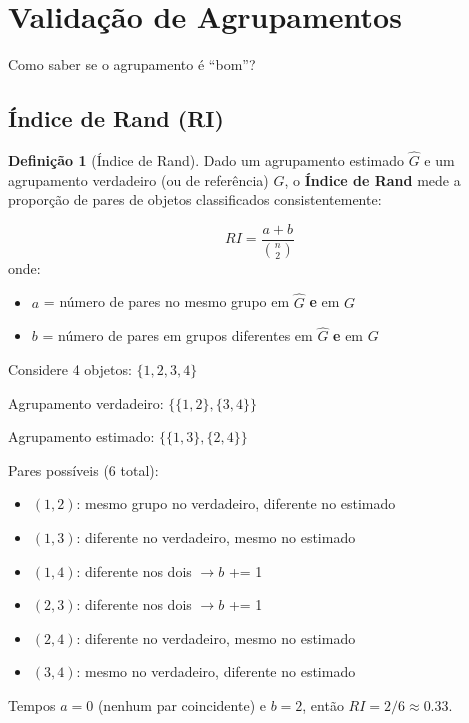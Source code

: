 \documentclass[12pt,a4paper]{article}
\theoremstyle{definition}
\newtheorem{definicao}{Definição}[section]
\begin{document}
\section{Validação de Agrupamentos}

Como saber se o agrupamento é ``bom''?

\subsection{Índice de Rand (RI)}

\begin{definicao}[Índice de Rand]
Dado um agrupamento estimado $\hat{G}$ e um agrupamento verdadeiro (ou de referência) $G$, o \textbf{Índice de Rand} mede a proporção de pares de objetos classificados consistentemente:

\begin{equation}
RI = \frac{a + b}{\binom{n}{2}}
\end{equation}
onde:
\begin{itemize}
    \item $a$ = número de pares no mesmo grupo em $\hat{G}$ \textbf{e} em $G$
    \item $b$ = número de pares em grupos diferentes em $\hat{G}$ \textbf{e} em $G$
\end{itemize}
\end{definicao}

\begin{tcolorbox}[caixaconceito={Exemplo Numérico}]
Considere 4 objetos: $\{1, 2, 3, 4\}$

Agrupamento verdadeiro: $\{\{1,2\}, \{3,4\}\}$

Agrupamento estimado: $\{\{1,3\}, \{2,4\}\}$

Pares possíveis (6 total):
\begin{itemize}
    \item $(1,2)$: mesmo grupo no verdadeiro, diferente no estimado
    \item $(1,3)$: diferente no verdadeiro, mesmo no estimado
    \item $(1,4)$: diferente nos dois $\rightarrow b$ += 1
    \item $(2,3)$: diferente nos dois $\rightarrow b$ += 1
    \item $(2,4)$: diferente no verdadeiro, mesmo no estimado
    \item $(3,4)$: mesmo no verdadeiro, diferente no estimado
\end{itemize}

Tempos $a=0$ (nenhum par coincidente) e $b=2$, então $RI = 2/6 \approx 0.33$.
\end{tcolorbox}
\end{document}

